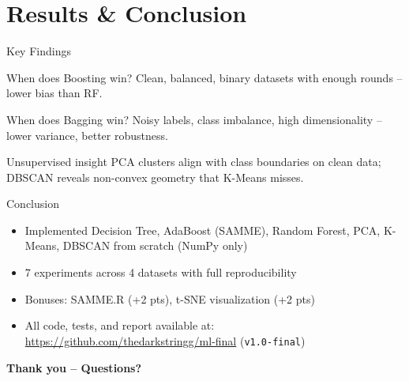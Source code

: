 \documentclass[aspectratio=169,12pt]{beamer}
\begin{document}
\section{Results \& Conclusion}
\begin{frame}{Key Findings}
\begin{block}{When does Boosting win?}
  Clean, balanced, binary datasets with enough rounds -- lower bias than RF.
\end{block}
\begin{block}{When does Bagging win?}
  Noisy labels, class imbalance, high dimensionality -- lower variance, better robustness.
\end{block}
\begin{block}{Unsupervised insight}
  PCA clusters align with class boundaries on clean data; DBSCAN reveals non-convex
  geometry that K-Means misses.
\end{block}
\end{frame}

\begin{frame}{Conclusion}
\begin{itemize}
  \item Implemented Decision Tree, AdaBoost (SAMME), Random Forest, PCA, K-Means,
        DBSCAN from scratch (NumPy only)
  \item 7 experiments across 4 datasets with full reproducibility
  \item Bonuses: SAMME.R (+2 pts), t-SNE visualization (+2 pts)
  \item All code, tests, and report available at:\\
        \url{https://github.com/thedarkstringg/ml-final} \quad (\texttt{v1.0-final})
\end{itemize}
\vfill
\begin{center}
\Large\textbf{Thank you -- Questions?}
\end{center}
\end{frame}
\end{document}
